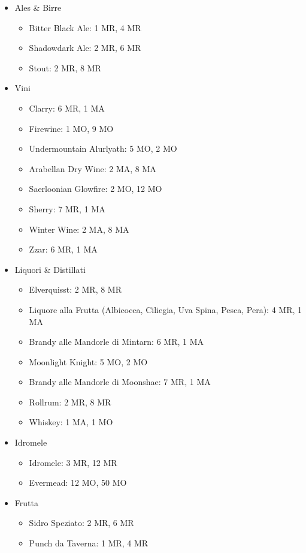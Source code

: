 \documentclass{article}
\begin{document}
\begin{itemize}
\begin{itemize}
\item {Ales \& Birre}
\begin{itemize}
    \item Bitter Black Ale: 1 MR, 4 MR
    \item Shadowdark Ale: 2 MR, 6 MR
    \item Stout: 2 MR, 8 MR
\end{itemize}

\item Vini
\begin{itemize}
    \item Clarry: 6 MR, 1 MA
    \item Firewine: 1 MO, 9 MO
    \item Undermountain Alurlyath: 5 MO, 2 MO
    \item Arabellan Dry Wine: 2 MA, 8 MA
    \item Saerloonian Glowfire: 2 MO, 12 MO
    \item Sherry: 7 MR, 1 MA
    \item Winter Wine: 2 MA, 8 MA
    \item Zzar: 6 MR, 1 MA
\end{itemize}

\item Liquori \& Distillati
\begin{itemize}
    \item Elverquisst: 2 MR, 8 MR
    \item Liquore alla Frutta (Albicocca, Ciliegia, Uva Spina, Pesca, Pera): 4 MR, 1 MA
    \item Brandy alle Mandorle di Mintarn: 6 MR, 1 MA
    \item Moonlight Knight: 5 MO, 2 MO
    \item Brandy alle Mandorle di Moonshae: 7 MR, 1 MA
    \item Rollrum: 2 MR, 8 MR
    \item Whiskey: 1 MA, 1 MO
\end{itemize}

\item Idromele
\begin{itemize}
    \item Idromele: 3 MR, 12 MR
    \item Evermead: 12 MO, 50 MO
\end{itemize}

\item Frutta
\begin{itemize}
    \item Sidro Speziato: 2 MR, 6 MR
    \item Punch da Taverna: 1 MR, 4 MR
\end{itemize}


\end{itemize}
\end{itemize}
\end{document}
